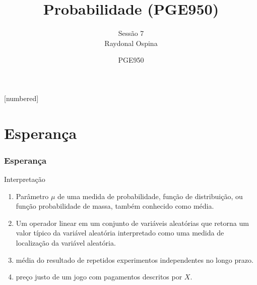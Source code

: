 


[numbered]



\hypersetup{colorlinks,linkcolor=,urlcolor=links}


\graphicspath{{./graphics/}} 			%

\newcommand{\cor}[1]{ \{{#1}\}}


\title[Probabilidade]{  Probabilidade (PGE950) }
\author[ Raydonal Ospina 
\ ]{
	Sessão 7 \\
	${}$ \\
	Raydonal Ospina  }
\date[PGE950 - \today ]{{\tiny PGE950 }}





\begin{frame}
  \titlepage
\end{frame}



\section{Esperança}
\begin{frame}
\frametitle{Esperança}
	\begin{block}{Interpretação}
	\begin{enumerate}
		\item Parâmetro $\mu$ de uma medida de probabilidade, função de distribuição, ou função probabilidade de massa, também conhecido como média.
		\item Um operador linear em um conjunto de variáveis aleatórias que
		retorna um valor típico da variável aleatória interpretado como uma
		medida de localização da variável aleatória.
		\item média do resultado de repetidos experimentos independentes no longo prazo.
		\item preço justo de um jogo com pagamentos descritos por $X$.
	\end{enumerate}
\end{block}
\end{frame}

